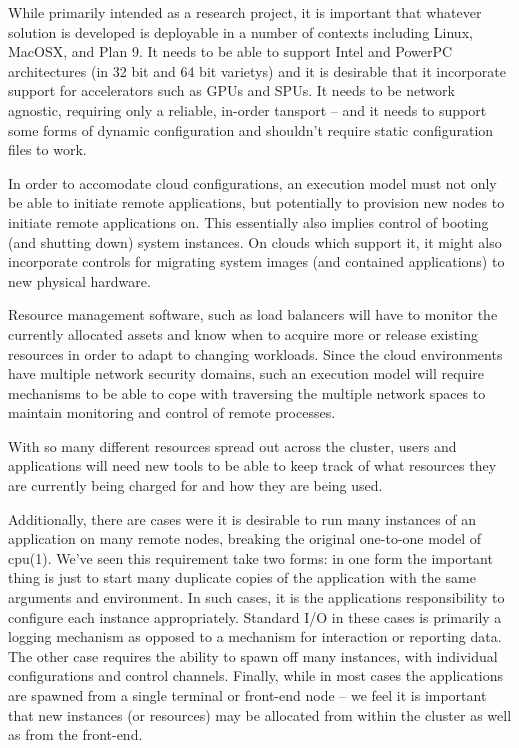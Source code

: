 \documentclass{sig-alternate}
\begin{document}
While primarily intended as a research project, it is important that
whatever solution is developed is deployable in a number of contexts
including Linux, MacOSX, and Plan 9.  It needs to be able to support
Intel and PowerPC architectures (in 32 bit and 64 bit varietys) and it
is desirable that it incorporate support for accelerators such as GPUs
and SPUs.  It needs to be network agnostic, requiring only a reliable,
in-order tansport -- and it needs to support some forms of dynamic 
configuration and shouldn't require static configuration files to work.


In order to accomodate cloud configurations, an execution model must not
only be able to initiate remote applications, but potentially to provision
new nodes to initiate remote applications on.  This essentially also implies
control of booting (and shutting down) system instances.  On clouds which
support it, it might also incorporate controls for migrating system
images (and contained applications) to new physical hardware.

Resource management software, such as load balancers will have to
monitor the currently allocated assets and know when to acquire more or
release existing resources in order to adapt to changing workloads.
Since the cloud environments have multiple network security domains, such 
an execution model will require mechanisms to be able to cope with 
traversing the multiple network spaces to maintain monitoring and control 
of remote processes. 

With so many different resources spread out across the cluster, users 
and applications will need new tools to be able to keep track of what
resources they are currently being charged for and how they are being
used.

Additionally, there are cases were it is desirable to run many instances
of an application on many remote nodes, breaking the original one-to-one
model of cpu(1).  We've seen this requirement take two forms: in one form
the important thing is just to start many duplicate copies of the application
with the same arguments and environment.  In such cases, it is the applications
responsibility to configure each instance appropriately.  Standard I/O in these
cases is primarily a logging mechanism as opposed to a mechanism for interaction
or reporting data.  The other case requires the ability to spawn off many 
instances, with individual configurations and control channels.  Finally,
while in most cases the applications are spawned from a single terminal or
front-end node -- we feel it is important that new instances (or resources)
may be allocated from within the cluster as well as from the front-end.
\end{document}
